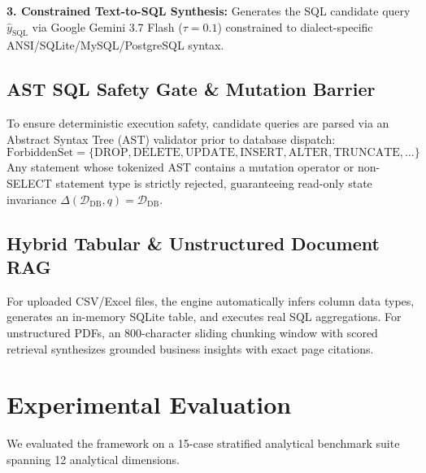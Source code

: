 \documentclass[conference]{IEEEtran}
\begin{document}
\textbf{3. Constrained Text-to-SQL Synthesis:} Generates the SQL candidate query $\hat{y}_{\text{SQL}}$ via Google Gemini 3.7 Flash ($\tau = 0.1$) constrained to dialect-specific ANSI/SQLite/MySQL/PostgreSQL syntax.

\subsection{AST SQL Safety Gate \& Mutation Barrier}
To ensure deterministic execution safety, candidate queries are parsed via an Abstract Syntax Tree (AST) validator prior to database dispatch:
\begin{equation}
\text{ForbiddenSet} = \{\text{DROP}, \text{DELETE}, \text{UPDATE}, \text{INSERT}, \text{ALTER}, \text{TRUNCATE}, \dots\}
\end{equation}
Any statement whose tokenized AST contains a mutation operator or non-SELECT statement type is strictly rejected, guaranteeing read-only state invariance $\Delta(\mathcal{D}_{\text{DB}}, q) = \mathcal{D}_{\text{DB}}$.

\subsection{Hybrid Tabular \& Unstructured Document RAG}
For uploaded CSV/Excel files, the engine automatically infers column data types, generates an in-memory SQLite table, and executes real SQL aggregations. For unstructured PDFs, an 800-character sliding chunking window with scored retrieval synthesizes grounded business insights with exact page citations.

\section{Experimental Evaluation}
We evaluated the framework on a 15-case stratified analytical benchmark suite spanning 12 analytical dimensions.

\begin{table}[htbp]
\caption{Quantitative Performance Across Baselines}
\begin{center}
\end{center}
\end{table}
\end{document}
